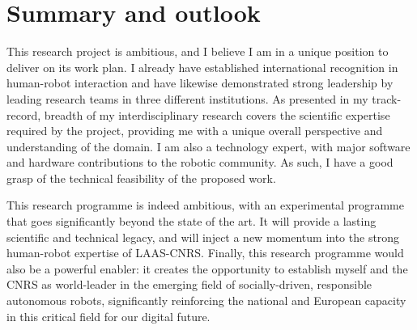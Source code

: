 %
%
%
%
%

\vspace{3em}
\section{Summary and outlook}


This research project is ambitious, and I believe I am in a unique position to
deliver on its work plan. I already have established international recognition in
human-robot interaction and have likewise demonstrated strong leadership by
leading research teams in three different institutions. As presented in my
track-record, breadth of my interdisciplinary research covers the scientific expertise
required by the project, providing me with a unique overall perspective and
understanding of the domain. I am also a technology expert, with major software
and hardware contributions to the robotic community. As such,
I have a good grasp of the technical feasibility of the proposed work.

This research programme is indeed ambitious, with an experimental programme that
goes significantly beyond the state of the art. It will provide a lasting
scientific and technical legacy, and will inject a new momentum into the strong
human-robot expertise of LAAS-CNRS. Finally, this research programme would also
be a powerful enabler: it creates the opportunity to establish myself and the
CNRS as world-leader in the emerging field of socially-driven, responsible
autonomous robots, significantly reinforcing the national and European capacity
in this critical field for our digital future.


